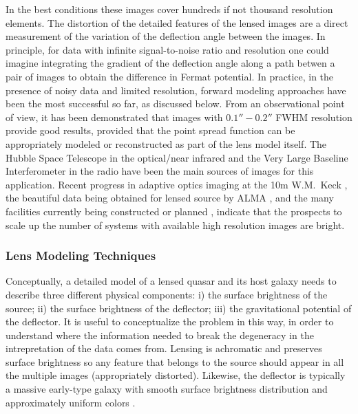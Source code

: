 In the best conditions these images cover hundreds if not thousand
resolution elements. The distortion of the detailed features of the
lensed images are a direct measurement of the variation of the
deflection angle between the images.  In principle, for data with
infinite signal-to-noise ratio and resolution one could imagine
integrating the gradient of the deflection angle along a path betwen a
pair of images to obtain the difference in Fermat potential. In
practice, in the presence of noisy data and limited resolution,
forward modeling approaches have been the most successful so far, as
discussed below. From an observational point of view, it has been
demonstrated that images with $0.1''-0.2''$ FWHM resolution provide
good results, provided that the point spread function can be
appropriately modeled or reconstructed as part of the lens model
itself. The Hubble Space Telescope in the optical/near infrared
\citep{Suy++10,Suy++13,Suy++14,BirrerEtal2015} and the Very Large Baseline
Interferometer in the radio \citep{WBB04} have been the main sources
of images for this application. Recent progress in adaptive optics
imaging at the 10m W.M.~Keck \citep{Che++16}, the beautiful data being
obtained for lensed source by ALMA \citep{Hez++13a}, and the many
facilities currently being constructed or planned \citep{Men++15},
indicate that the prospects to scale up the number of systems with
available high resolution images are bright.


\subsubsection{Lens Modeling Techniques}

Conceptually, a detailed model of a lensed quasar and its host galaxy
needs to describe three different physical components: i) the surface
brightness of the source; ii) the surface brightness of the deflector;
iii) the gravitational potential of the deflector. It is useful to
conceptualize the problem in this way, in order to understand where
the information needed to break the degeneracy in the intrepretation
of the data comes from. Lensing is achromatic and preserves surface
brightness so any feature that belongs to the source \cite[including
in line of sight velocity][]{Hez++13} should appear in all the
multiple images (appropriately distorted). Likewise, the deflector is
typically a massive early-type galaxy with smooth surface brightness
distribution and approximately uniform colors \cite[except for dust,
see, e.g.][]{Suy++10}.

